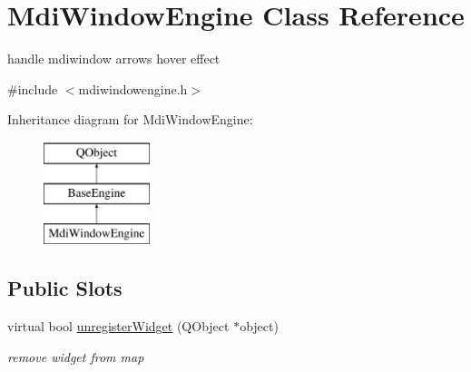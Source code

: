 \hypertarget{class_mdi_window_engine}{}\section{Mdi\+Window\+Engine Class Reference}
\label{class_mdi_window_engine}


handle mdiwindow arrows hover effect  




{\ttfamily \#include $<$mdiwindowengine.\+h$>$}

Inheritance diagram for Mdi\+Window\+Engine\+:\begin{figure}[H]
\begin{center}
\leavevmode
\includegraphics[height=3.000000cm]{class_mdi_window_engine}
\end{center}
\end{figure}
\subsection*{Public Slots}
\begin{DoxyCompactItemize}
\item 
\mbox{\label{class_mdi_window_engine_adbaa021617a69b912d78877f3099cd2a}} 
virtual bool \hyperlink{class_mdi_window_engine_adbaa021617a69b912d78877f3099cd2a}{unregister\+Widget} (Q\+Object $\ast$object)
\begin{DoxyCompactList}\small\item\em remove widget from map \end{DoxyCompactList}\end{DoxyCompactItemize}
